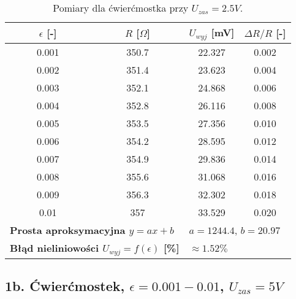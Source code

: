 \documentclass[12pt, a4paper]{article}
\begin{document}
	\begin{table}[H]
		\centering
		\caption{Pomiary dla ćwierćmostka przy $U_{zas} = 2.5 V$.}
		\begin{tabular}{cccc}
			\toprule
			$\epsilon$ [-] & $R$ [$\Omega$] & $U_{wyj}$ [mV] & $\Delta R/R$ [-] \\
			\midrule
			0.001 & 350.7 & 22.327 & 0.002 \\
			0.002 & 351.4 & 23.623 & 0.004 \\
			0.003 & 352.1 & 24.868 & 0.006 \\
			0.004 & 352.8 & 26.116 & 0.008 \\
			0.005 & 353.5 & 27.356 & 0.010 \\
			0.006 & 354.2 & 28.595 & 0.012 \\
			0.007 & 354.9 & 29.836 & 0.014 \\
			0.008 & 355.6 & 31.068 & 0.016 \\
			0.009 & 356.3 & 32.302 & 0.018 \\
			0.01 & 357 & 33.529 & 0.020 \\
			\midrule
			\multicolumn{2}{l}{\textbf{Prosta aproksymacyjna $y = ax + b$}} & \multicolumn{2}{l}{$a = 1244.4$, $b = 20.97$} \\
			\multicolumn{2}{l}{\textbf{Błąd nieliniowości $U_{wyj} = f(\epsilon)$ [\%]}} & \multicolumn{2}{l}{$\approx 1.52 \%$} \\
			\bottomrule
		\end{tabular}
	\end{table}
	
	\subsection{1b. Ćwierćmostek, $\epsilon = 0.001-0.01$, $U_{zas} = 5 V$}
	
\end{document}

